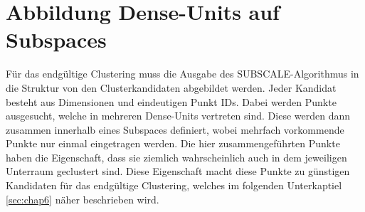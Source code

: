 \section{Abbildung Dense-Units auf Subspaces}\label{sec:chap5}

Für das endgültige Clustering muss die Ausgabe des SUBSCALE-Algorithmus in die Struktur von den
Clusterkandidaten abgebildet werden. Jeder Kandidat besteht aus Dimensionen und eindeutigen Punkt
IDs. Dabei werden Punkte ausgesucht, welche in mehreren Dense-Units vertreten sind. Diese werden
dann zusammen innerhalb eines Subspaces definiert, wobei mehrfach vorkommende Punkte nur einmal
eingetragen werden. Die hier zusammengeführten Punkte haben die Eigenschaft, dass sie ziemlich
wahrscheinlich auch in dem jeweiligen Unterraum geclustert sind. Diese Eigenschaft macht diese
Punkte zu günstigen Kandidaten für das endgültige Clustering, welches im folgenden Unterkaptiel
\ref{sec:chap6} näher beschrieben wird.
